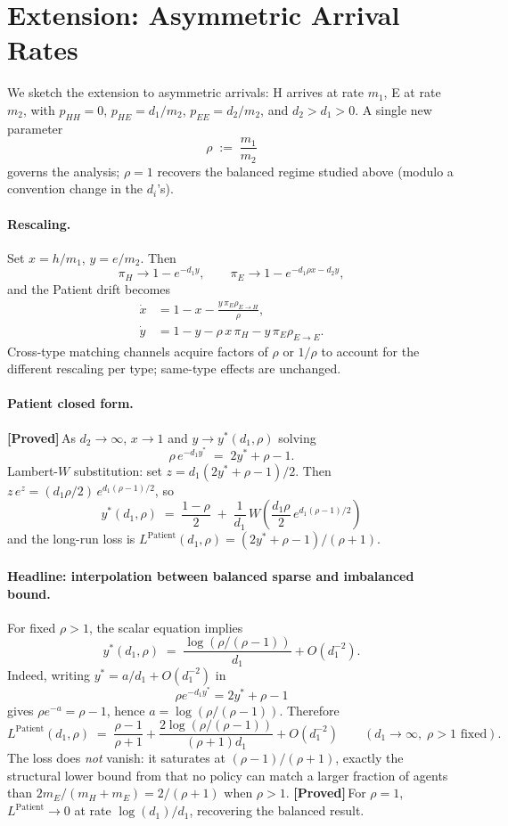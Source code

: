 \documentclass{article}
\theoremstyle{plain}
\theoremstyle{definition}
\newcommand{\proved}{\textcolor{provedgreen}{\textbf{[Proved]}}\,}
\begin{document}
\section{Extension: Asymmetric Arrival Rates}\label{sec:asymmetric}
 
We sketch the extension to asymmetric arrivals: H arrives at rate $m_1$, E at rate $m_2$, with $p_{HH}=0$, $p_{HE}=d_1/m_2$, $p_{EE}=d_2/m_2$, and $d_2>d_1>0$. A single new parameter
\[
\rho \;:=\; \frac{m_1}{m_2}
\]
governs the analysis; $\rho=1$ recovers the balanced regime studied above (modulo a convention change in the $d_i$'s).
 
\paragraph{Rescaling.}
Set $x=h/m_1$, $y=e/m_2$. Then
\[
\pi_H \to 1-e^{-d_1 y},\qquad \pi_E \to 1-e^{-d_1\rho x - d_2 y},
\]
and the Patient drift becomes
\begin{align*}
\dot x &= 1-x-\frac{y\,\pi_E\rho_{E\to H}}{\rho},\\
\dot y &= 1-y-\rho\,x\,\pi_H-y\,\pi_E\rho_{E\to E}.
\end{align*}
Cross-type matching channels acquire factors of $\rho$ or $1/\rho$ to account for the different rescaling per type; same-type effects are unchanged.
 
\paragraph{Patient closed form.}
\proved As $d_2\to\infty$, $x\to 1$ and $y\to y^\ast(d_1,\rho)$ solving
\[
\rho\,e^{-d_1 y^\ast}\;=\;2y^\ast+\rho-1.
\]
Lambert-$W$ substitution: set $z=d_1(2y^\ast+\rho-1)/2$. Then $z\,e^z=(d_1\rho/2)\,e^{d_1(\rho-1)/2}$, so
\[
\;y^\ast(d_1,\rho) \;=\; \frac{1-\rho}{2}\;+\;\frac{1}{d_1}\,W\!\left(\frac{d_1\rho}{2}\,e^{d_1(\rho-1)/2}\right)\;
\]
and the long-run loss is $L^{\text{Patient}}(d_1,\rho) = (2y^\ast+\rho-1)/(\rho+1)$.
 
\paragraph{Headline: interpolation between balanced sparse and imbalanced bound.}
For fixed $\rho>1$, the scalar equation implies
\[
y^\ast(d_1,\rho)
\;=\;
\frac{\log(\rho/(\rho-1))}{d_1}
+O(d_1^{-2}).
\]
Indeed, writing $y^\ast=a/d_1+O(d_1^{-2})$ in
\[
\rho e^{-d_1y^\ast}=2y^\ast+\rho-1
\]
gives $\rho e^{-a}=\rho-1$, hence $a=\log(\rho/(\rho-1))$. Therefore
\[
L^{\text{Patient}}(d_1,\rho)
\;=\;
\frac{\rho-1}{\rho+1}
+\frac{2\log(\rho/(\rho-1))}{(\rho+1)d_1}
+O(d_1^{-2})
\qquad(d_1\to\infty,\;\rho>1\text{ fixed}).
\]
The loss does \emph{not} vanish: it saturates at $(\rho-1)/(\rho+1)$, exactly the structural lower bound from \cite{ashlagi2023matching} that no policy can match a larger fraction of agents than $2m_E/(m_H+m_E)=2/(\rho+1)$ when $\rho>1$. \proved For $\rho=1$, $L^{\text{Patient}}\to 0$ at rate $\log(d_1)/d_1$, recovering the balanced result.
 
\end{document}
